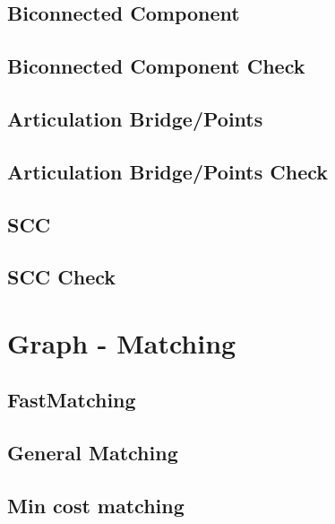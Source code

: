 \subsection{Biconnected Component}
\raggedbottom
\hrulefill
\subsection{Biconnected Component Check}
\raggedbottom
\hrulefill
\subsection{Articulation Bridge/Points}
\raggedbottom
\hrulefill
\subsection{Articulation Bridge/Points Check}
\raggedbottom
\hrulefill
\subsection{SCC}
\raggedbottom
\hrulefill
\subsection{SCC Check}
\raggedbottom
\hrulefill

\section{Graph - Matching}
\subsection{FastMatching}
\raggedbottom
\hrulefill
\subsection{General Matching}
\raggedbottom
\hrulefill
\subsection{Min cost matching}
\raggedbottom
\hrulefill
